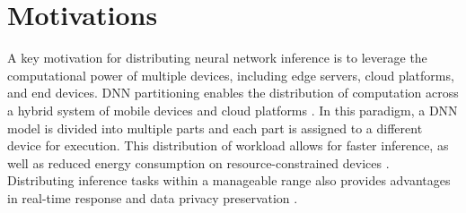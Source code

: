 \documentclass[conference]{IEEEtran}
\begin{document}







\section{Motivations}

A key motivation for distributing neural network inference is to leverage the computational power of multiple devices, including edge servers, cloud platforms, and end devices. DNN partitioning enables the distribution of computation across a hybrid system of mobile devices and cloud platforms \cite{zhang2020towards, zhang2021deepslicing, li2018edge}. In this paradigm, a DNN model is divided into multiple parts and each part is assigned to a different device for execution. This distribution of workload allows for faster inference, as well as reduced energy consumption on resource-constrained devices \cite{zeng2020coedge, yun2022cooperative}. Distributing inference tasks within a manageable range also provides advantages in real-time response and data privacy preservation \cite{zeng2020coedge}.
\end{document}
